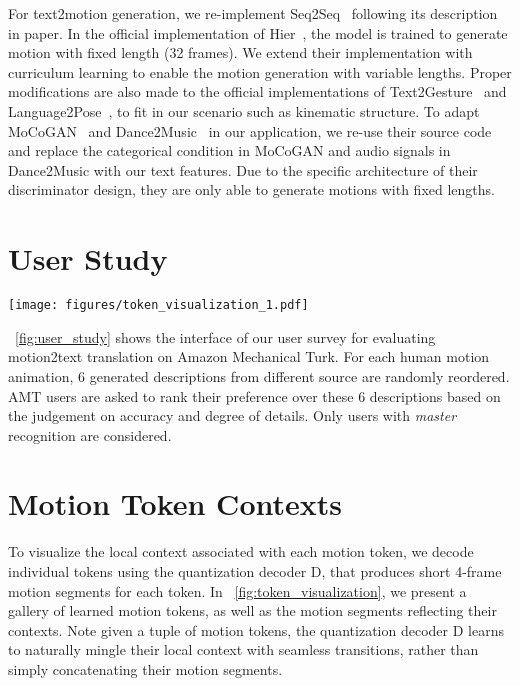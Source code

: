 \documentclass[runningheads]{llncs}
\newcommand{\beforefigcaption}{\vspace{-9mm}}
\newcommand{\afterfigcaption}{\vspace{-5mm}}
\newcommand{\beforesection}{\vspace{-2mm}}
\newcommand{\aftersection}{\vspace{-2mm}}
\begin{document}
For text2motion generation, we re-implement Seq2Seq~\cite{lin2018generating} following its description in paper. In the official implementation of Hier~\cite{ghosh2021synthesis}, the model is trained to generate motion with fixed length (32 frames). We extend their implementation with curriculum learning to enable the motion generation with variable lengths. Proper modifications are also made to the official implementations of Text2Gesture~\cite{bhattacharya2021text2gestures} and Language2Pose~\cite{ahuja2019language2pose}, to fit in our scenario such as kinematic structure. To adapt MoCoGAN~\cite{tulyakov2018mocogan} and Dance2Music~\cite{huang2020dance} in our application, we re-use their source code and replace the categorical condition in MoCoGAN and audio signals in Dance2Music with our text features. Due to the specific architecture of their discriminator design, they are only able to generate motions with fixed lengths.
\beforesection
\section{User Study}
\aftersection

\begin{figure*}[t]
	\centering
	\texttt{[image: figures/token\_visualization\_1.pdf]}
		 \beforefigcaption
	\caption{Exemplar motion tokens and their associated local spatial-temporal contexts, visualized in 4-frame motion segments.} 
	\label{fig:token_visualization}
	 \afterfigcaption
\end{figure*}

~\cref{fig:user_study} shows the interface of our user survey for evaluating motion2text translation on Amazon Mechanical Turk. For each human motion animation, 6 generated descriptions from different source are randomly reordered. AMT users are asked to rank their preference over these 6 descriptions based on the judgement on accuracy and degree of details. Only users with \textit{master} recognition are considered.
\beforesection
\section{Motion Token Contexts}
\aftersection
To visualize the local context associated with each motion token, we decode individual tokens using the quantization decoder $\mathrm{D}$, that produces short 4-frame motion segments for each token. In ~\cref{fig:token_visualization}, we present a gallery of learned motion tokens, as well as the motion segments reflecting their contexts. Note given a tuple of motion tokens, the quantization decoder $\mathrm{D}$ learns to naturally mingle their local context with seamless transitions, rather than simply concatenating their motion segments. 
\end{document}
